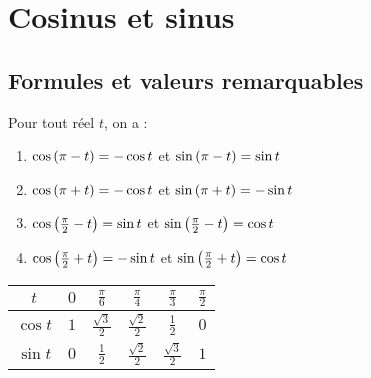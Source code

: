 \section{Cosinus et sinus}
\subsection{Formules et valeurs remarquables}

\begin{formu}
	Pour tout réel \(t\), on a :
	\begin{enumerate}
		\item \( \cos\left(\pi - t\right) = -\cos t \) et \( \sin\left(\pi - t\right) = \sin t \) \\
		\item \( \cos\left(\pi + t\right) = -\cos t \) et \( \sin\left(\pi + t\right) = -\sin t \) \\
		\item \( \cos\left(\frac{\pi}{2} - t\right) = \sin t \) et \( \sin\left(\frac{\pi}{2} - t\right) = \cos t \) \\
		\item \( \cos\left(\frac{\pi}{2} + t\right) = -\sin t \) et \( \sin\left(\frac{\pi}{2} + t\right) = \cos t \) \\
	\end{enumerate}
    \renewcommand{\arraystretch}{2.75}
	\begin{tabular}{|c|c|c|c|c|c|}

		\hline
		\(t\)       & \(0\) & \(\frac{\pi}{6}\)      & \(\frac{\pi}{4}\)      & \(\frac{\pi}{3}\)       & \(\frac{\pi}{2}\) \\
		\hline
		\(\cos t \) & \(1\) & \(\frac{\sqrt{3}}{2}\) & \(\frac{\sqrt{2}}{2}\) & \(\frac{1}{2}\)        & \(0\)             \\
		\hline
		\(\sin t \) & \(0\) & \(\frac{1}{2}\)        & \(\frac{\sqrt{2}}{2}\) & \(\frac{\sqrt{3}}{2}\) & \(1\)             \\
		\hline
	\end{tabular}
\end{formu}


